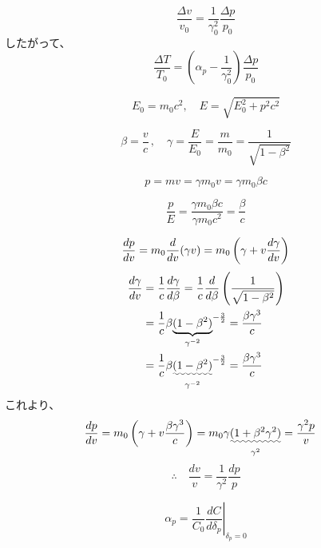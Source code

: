 \documentclass[10pt,a4paper]{ltjsarticle}
\begin{document}
%
\begin{equation}
    \frac{\Delta v}{v_0}=\frac{1}{\gamma_0^2}\frac{\Delta p}{p_0}
    \label{delta_v}
\end{equation}
%
したがって、
%
\begin{equation}
    \frac{\Delta T}{T_0} = \left(\alpha_p - \frac{1}{\gamma_0^2}\right)\frac{\Delta p}{p_0}
\end{equation}
%
\begin{tcolorbox}[title=相対論のおさらい]
    \begin{equation}
        E_0 = m_0 c^2 ,\quad E = \sqrt{E_0^2 + p^2 c^2} \tag{A.1}
    \end{equation}

    \begin{equation}
        \beta = \frac{v}{c}\,,\quad \gamma = \frac{E}{E_0}=\frac{m}{m_0}=\frac{1}{\sqrt{1-\beta^2}} \tag{A.2}
    \end{equation}

    \begin{equation}
        p = mv = \gamma m_0 v = \gamma m_0 \beta c \tag{A.3}
    \end{equation}

    \begin{equation}
        \frac{p}{E} = \frac{\gamma m_0 \beta c}{\gamma m_0 c^2} = \frac{\beta}{c} \tag{A.4}
    \end{equation}
\end{tcolorbox}
\begin{tcolorbox}[title=式 (\ref{delta_v}) の導出]
    \begin{equation}
        \frac{dp}{dv} = m_0\frac{d}{dv}(\gamma v)
        = m_0 \left(\gamma + v \frac{d\gamma}{dv}\right) \notag
    \end{equation}
    \begin{align}
        \frac{d\gamma}{dv} & = \frac{1}{c}\frac{d\gamma}{d\beta}= \frac{1}{c}\frac{d}{d\beta}\left(\frac{1}{\sqrt{1-\beta^2}}\right) \notag \\
        & = \frac{1}{c} \beta \underset{\gamma^{-2}}{\underbrace{(1-\beta^2)}}^{-\frac{3}{2}} = \frac{\beta \gamma^3}{c} \notag \\
        & = \frac{1}{c} \beta \underset{\gamma^{-2}}{\uwave{(1-\beta^2)}}^{-\frac{3}{2}} = \frac{\beta \gamma^3}{c} \notag
    \end{align}
    これより、
    \begin{align}
        \frac{dp}{dv} & = m_0 \left(\gamma + v \frac{\beta \gamma^3}{c}\right)
        = m_0 \gamma \underset{\gamma^2}{\uwave{(1 + \beta^2 \gamma^2)}}
        = \frac{\gamma^2 p}{v} \notag
    \end{align}
    \begin{equation}
        \therefore \quad \frac{dv}{v} = \frac{1}{\gamma^2}\frac{dp}{p} \tag{B.1}
    \end{equation}
\end{tcolorbox}
%
\begin{equation}
    \alpha_p = \frac{1}{C_0}\left.\frac{dC}{d\delta_p}\right|_{\delta_p = 0}
\end{equation}
%
\end{document}
